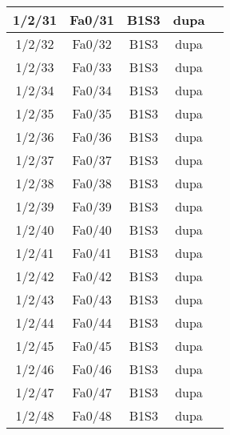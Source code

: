 \begin{center}
\begin{longtable}{|c|c|c|c|c|}
	1/2/31 & Fa0/31 & B1S3 & dupa \\ \hline
	1/2/32 & Fa0/32 & B1S3 & dupa \\ \hline
	1/2/33 & Fa0/33 & B1S3 & dupa \\ \hline
	1/2/34 & Fa0/34 & B1S3 & dupa \\ \hline
	1/2/35 & Fa0/35 & B1S3 & dupa \\ \hline
	1/2/36 & Fa0/36 & B1S3 & dupa \\ \hline
	1/2/37 & Fa0/37 & B1S3 & dupa \\ \hline
	1/2/38 & Fa0/38 & B1S3 & dupa \\ \hline
	1/2/39 & Fa0/39 & B1S3 & dupa \\ \hline
	1/2/40 & Fa0/40 & B1S3 & dupa \\ \hline
	1/2/41 & Fa0/41 & B1S3 & dupa \\ \hline
	1/2/42 & Fa0/42 & B1S3 & dupa \\ \hline
	1/2/43 & Fa0/43 & B1S3 & dupa \\ \hline
	1/2/44 & Fa0/44 & B1S3 & dupa \\ \hline
	1/2/45 & Fa0/45 & B1S3 & dupa \\ \hline
	1/2/46 & Fa0/46 & B1S3 & dupa \\ \hline
	1/2/47 & Fa0/47 & B1S3 & dupa \\ \hline
	1/2/48 & Fa0/48 & B1S3 & dupa \\ \hline

    \end{longtable}
\end{center}

